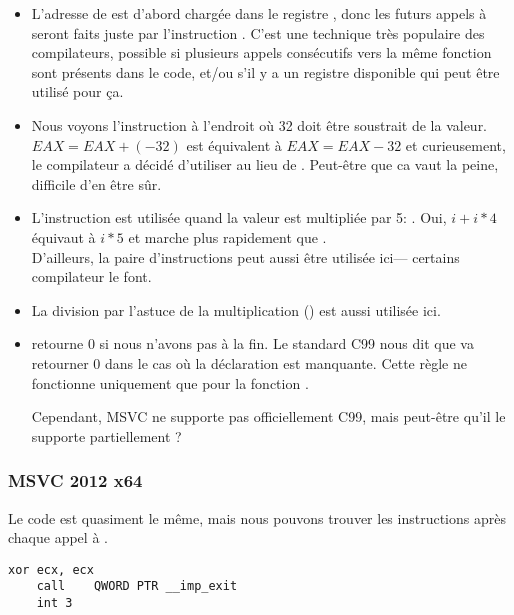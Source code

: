 \begin{itemize}
\item L'adresse de \printf est d'abord chargée dans le
registre \ESI, donc les futurs
appels à \printf seront faits juste par l'instruction .
C'est une technique très populaire
des compilateurs, possible si plusieurs appels consécutifs vers la même fonction sont présents
dans le code, et/ou s'il y a un registre disponible qui peut être utilisé pour ça.

\item Nous voyons l'instruction  
à l'endroit où 32 doit être soustrait de la valeur.
$EAX=EAX+(-32)$ est équivalent à $EAX=EAX-32$ 
et curieusement, le compilateur a décidé d'utiliser  au lieu de .
Peut-être que ca vaut la peine, difficile d'en être sûr.

\item L'instruction \LEA est utilisée quand 
la valeur est multipliée par 5: .
Oui, $i+i*4$ équivaut à $i*5$ et \LEA 
marche plus rapidement que .\\
D'ailleurs, la paire d'instructions  peut aussi être utilisée ici---
certains compilateur le font.

\item La division par l'astuce de la multiplication () 
est aussi utilisée ici.

\item \main retourne 0 si nous n'avons pas  
à la fin.
Le standard C99 nous dit  que \main 
va retourner 0 dans le cas où 
la déclaration  est manquante.
Cette règle ne fonctionne uniquement que pour la fonction \main.

Cependant, MSVC ne supporte pas officiellement C99, mais peut-être qu'il le supporte partiellement ?
\end{itemize}

\subsubsection{MSVC 2012 x64 \Optimizing}

Le code est quasiment le même, mais nous pouvons trouver les instructions  après chaque appel à .

\begin{lstlisting}[style=customasmx86]
	xor	ecx, ecx
	call	QWORD PTR __imp_exit
	int	3
\end{lstlisting}

